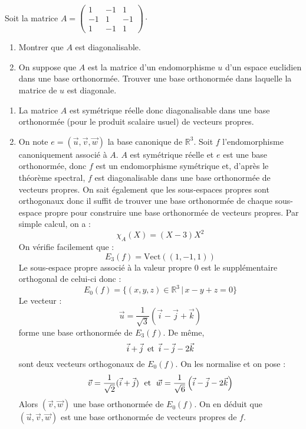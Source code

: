 \documentclass[a4paper,10pt]{report}
\begin{document}
\begin{Exercice}{} Soit la matrice $A=\begin{pmatrix}
1 & -1 & 1 \\ 
-1 & 1 & -1 \\ 
1 & -1 & 1
\end{pmatrix} \cdot$
\begin{enumerate}
\item Montrer que $A$ est diagonalisable.
\item On suppose que $A$ est la matrice d'un endomorphisme $u$ d'un espace euclidien dans une base orthonormée. Trouver une base orthonormée dans laquelle la matrice de $u$ est diagonale.
\end{enumerate}
\end{Exercice}

\corr 

\begin{enumerate}
\item La matrice $A$ est symétrique réelle donc diagonalisable dans une base orthonormée (pour le produit scalaire usuel) de vecteurs propres.
\item On note $e=\left( \vec{u},\vec{v},\vec{w}\right) $ la base canonique de $\mathbb{R}^3$. Soit $f$ l'endomorphisme canoniquement associé à $A$. $A$ est symétrique réelle et $e$ est une base orthonormée, donc $f$ est un endomorphisme symétrique et, d'après le théorème spectral,  $f$ est diagonalisable dans une base orthonormée de vecteurs propres. On sait également que les sous-espaces propres sont orthogonaux donc il suffit de trouver une base orthonormée de chaque sous-espace propre pour construire une base orthonormée de vecteurs propres. Par simple calcul, on a :
$$ \chi_A(X) = (X-3)X^2$$
On vérifie facilement que :
$$E_3 (f) = \textrm{Vect} ((1, - 1,1))$$
Le sous-espace propre associé à la valeur propre $0$ est le supplémentaire orthogonal de celui-ci donc :
$$E_0 (f) = \lbrace (x,y,z) \in \mathbb{R}^3 \, \vert \, x - y + z = 0\rbrace$$
Le vecteur :
$$\vec{u} = \dfrac{1}{{\sqrt 3 }}(\vec{i} - \vec{j} + \vec{k})$$
forme une base orthonormée de $E_3 (f)$. De même,
$$\vec i+\vec j  \, \hbox{ et } \, \vec i-\vec j-2\vec k$$
 sont deux vecteurs orthogonaux de $E_0(f)$. On les normalise et on pose :
$$\vec{v} = \dfrac{1}{{\sqrt 2 }}(\vec{i} + \vec{j}) \; \hbox{ et } \; \vec{w} = \dfrac{1}{{\sqrt 6 }}\left( {\vec{i} - \vec{j} - 2\vec{k}} \right) $$
Alors $\left( \vec{v} ,\vec{w} \right) $ une base orthonormée de $E_0(f)$. On en déduit que $\left( \vec{u},\vec{v},\vec{w}\right) $ est une base orthonormée de vecteurs propres de $f$.
\end{enumerate}
\end{document}
